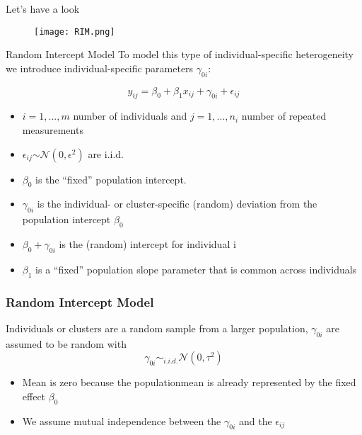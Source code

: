 \documentclass{beamer}
\begin{document}
\begin{frame}{Let's have a look}
    \begin{figure}
    
    \texttt{[image: RIM.png]}
    
    \end{figure}

\end{frame}

\begin{frame}{Random Intercept Model}
	To model this type of individual-specific heterogeneity we introduce individual-specific parameters $\gamma_{0i}$:
	
	\begin{equation}
		y_{ij}=\beta_0+\beta_1x_{ij}+\gamma_{0i}+\epsilon_{ij}
	\end{equation}
	\begin{itemize}
		
		\item $i=1,...,m$ number of individuals and $j=1,...,n_i$ number of repeated measurements
		\item $\epsilon_{ij}$$\sim\mathcal{N}(0,\epsilon^2)$ are i.i.d.
		\item $\beta_0$ is the “fixed” population intercept.
		\item $\gamma_{0i}$ is the individual- or cluster-specific (random) deviation from the population intercept $\beta_0$
		\item $\beta_0+\gamma_{0i}$ is the (random) intercept for individual i 
		\item $\beta_1$ is a “fixed” population slope parameter that is common across
		individuals
	\end{itemize}
\end{frame}

\begin{frame}
\frametitle{Random Intercept Model}
Individuals or clusters are a random sample from a larger population, $\gamma_{0i}$ are assumed to be random with
\begin{equation}
	\gamma_{0i} \sim_{i.i.d.}\mathcal{N}(0,\tau^2)
\end{equation}
\begin{itemize}
\item Mean is zero because the populationmean is already represented
by the fixed effect $\beta_0$
\item We assume mutual independence between the $\gamma_{0i}$ and the $\epsilon_{ij}$
\end{itemize}
\end{frame}
\end{document}
